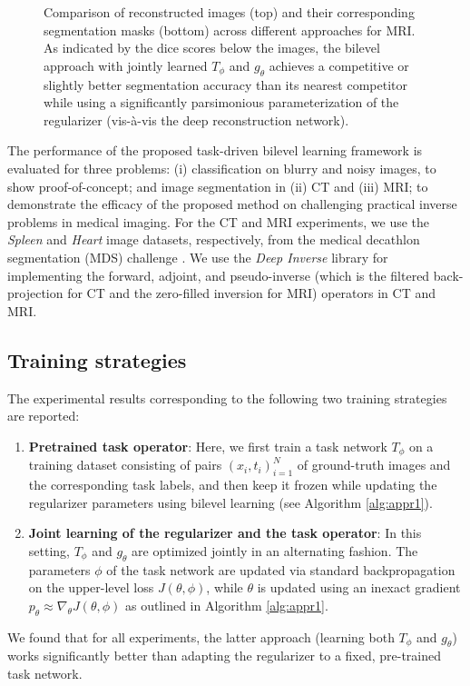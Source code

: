 \begin{figure}[htbp]
\begin{tabular}{c | c c c c c c}
    \end{tabular}
    \vspace{10pt} %
    \caption{Comparison of reconstructed images (top) and their corresponding segmentation masks (bottom) across different approaches for MRI. As indicated by the dice scores below the images, the bilevel approach with jointly learned $T_{\phi}$ and $g_{\theta}$ achieves a competitive or slightly better segmentation accuracy than its nearest competitor while using a significantly parsimonious parameterization of the regularizer (vis-à-vis the deep reconstruction network).}
    \label{fig:reconstruction_and_masks_mri}
\end{figure}
The performance of the proposed task-driven bilevel learning framework is evaluated for three problems: (i) classification on blurry and noisy images, to show proof-of-concept; and image segmentation in (ii) CT and (iii) MRI; to demonstrate the efficacy of the proposed method on challenging practical inverse problems in medical imaging. For the CT and MRI experiments, we use the \textit{Spleen} and \textit{Heart} image datasets, respectively, from the medical decathlon segmentation (MDS) challenge \cite{Antonelli2022}. We use the \textit{Deep Inverse} library \cite{Tachella2025DeepInverse} for implementing the forward, adjoint, and pseudo-inverse (which is the filtered back-projection for CT and the zero-filled inversion for MRI) operators in CT and MRI.
\subsection{Training strategies}
\noindent The experimental results corresponding to the following two training strategies are reported: 
\begin{enumerate}[leftmargin=*,nosep]
    \item \textbf{Pretrained task operator}: Here, we first train a task network $T_{\phi}$ on a training dataset consisting of pairs $(x_i,t_i)_{i=1}^N$ of ground-truth images and the corresponding task labels, and then keep it frozen while updating the regularizer parameters using bilevel learning (see Algorithm \ref{alg:appr1}).    
    \item \textbf{Joint learning of the regularizer and the task operator}: In this setting, $T_{\phi}$ and $g_{\theta}$ are optimized jointly in an alternating fashion. The parameters $\phi$ of the task network are updated via standard backpropagation on the upper-level loss $J(\theta,\phi)$, while $\theta$ is updated using an inexact gradient $p_{\theta}\approx\nabla_{\theta}J(\theta,\phi)$ as outlined in Algorithm \ref{alg:appr1}.
\end{enumerate}
We found that for all experiments, the latter approach (learning both $T_{\phi}$ and $g_{\theta}$) works significantly better than adapting the regularizer to a fixed, pre-trained task network. 
